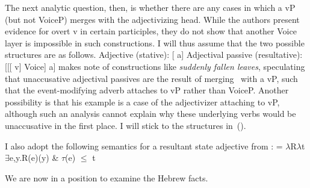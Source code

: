 The next analytic question, then, is whether there are any cases in which a vP (but not VoiceP) merges with the adjectivizing head. While the authors present evidence for overt v in certain participles, they do not show that another Voice layer is impossible in such constructions. I will thus assume that the two possible structures are as follows.
\pex
	\a Adjective (stative): {[} a]
	\a Adjectival passive (resultative): {[}[[ v] Voice] a]
\xe
\citet[391]{bruening14nllt} makes note of constructions like \emph{suddenly fallen leaves}, speculating that unaccusative adjectival passives are the result of merging \vz~with a vP, such that the event-modifying adverb attaches to vP rather than VoiceP. Another possibility is that his example is a case of the adjectivizer attaching to vP, although such an analysis cannot explain why these underlying verbs would be unaccusative in the first place. I will stick to the structures in~(\lastx).

I also adopt the following semantics for a resultant state adjective from \cite{kratzer00bls}:
\ex {} = $\lambda$R$\lambda$t$\exists$e,y.R(e)(y) \& $\tau$(e) $\le$ t
\xe

We are now in a position to examine the Hebrew facts.


